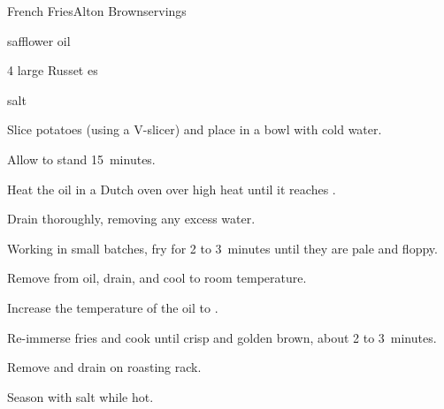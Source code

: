 \begin{recipe}{French Fries}{Alton Brown}{servings}


\begin{ingredients}
\item {} safflower oil
\item 4 large Russet es
\item salt
\end{ingredients}

\begin{directions}
\item Slice potatoes (using a V-slicer) and place in a bowl with cold water.
\item Allow to stand 15~minutes.
\item Heat the oil in a Dutch oven over high heat until it reaches .
\item Drain thoroughly, removing any excess water.
\item Working in small batches, fry for 2 to 3~minutes until they are pale and floppy.
\item Remove from oil, drain, and cool to room temperature.
\item Increase the temperature of the oil to .
\item Re-immerse fries and cook until crisp and golden brown, about 2 to 3~minutes.
\item Remove and drain on roasting rack.
\item Season with salt while hot.
\end{directions}

\end{recipe}
